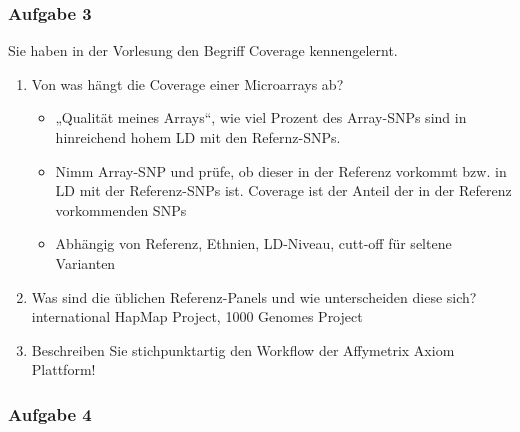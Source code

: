 \subsubsection{Aufgabe 3}
Sie haben in der Vorlesung den Begriff Coverage kennengelernt.\\
\begin{enumerate}
	\item Von was hängt die Coverage einer Microarrays ab?
	\begin{itemize}
		\item „Qualität meines Arrays“, wie viel Prozent des Array-SNPs sind in hinreichend hohem LD mit den Refernz-SNPs.
		\item Nimm Array-SNP und prüfe, ob dieser in der Referenz vorkommt bzw. in LD mit der Referenz-SNPs ist. Coverage ist der Anteil der in der Referenz vorkommenden SNPs
		\item Abhängig von Referenz, Ethnien, LD-Niveau, cutt-off für seltene Varianten
	\end{itemize}
	\item Was sind die üblichen Referenz-Panels und wie unterscheiden diese sich? 
international HapMap Project, 1000 Genomes Project
	\item Beschreiben Sie stichpunktartig den Workflow der Affymetrix Axiom Plattform!
\end{enumerate}

\subsubsection{Aufgabe 4}